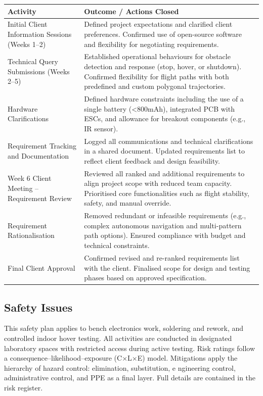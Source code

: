 \begin{tabular}{|p{4cm}|p{10cm}|}
\hline
\rowcolor{gray!15}
\textbf{Activity} & \textbf{Outcome / Actions Closed} \\
\hline
Initial Client Information Sessions (Weeks 1–2) & Defined project expectations and clarified client preferences. Confirmed use of open-source software and flexibility for negotiating requirements. \\ \hline
Technical Query Submissions (Weeks 2–5) & Established operational behaviours for obstacle detection and response (stop, hover, or shutdown). Confirmed flexibility for flight paths with both predefined and custom polygonal trajectories. \\ \hline
Hardware Clarifications & Defined hardware constraints including the use of a single battery (<800mAh), integrated PCB with ESCs, and allowance for breakout components (e.g., IR sensor). \\ \hline
Requirement Tracking and Documentation & Logged all communications and technical clarifications in a shared document. Updated requirements list to reflect client feedback and design feasibility. \\ \hline
Week 6 Client Meeting – Requirement Review & Reviewed all ranked and additional requirements to align project scope with reduced team capacity. Prioritised core functionalities such as flight stability, safety, and manual override. \\ \hline
Requirement Rationalisation & Removed redundant or infeasible requirements (e.g., complex autonomous navigation and multi-pattern path options). Ensured compliance with budget and technical constraints. \\ \hline
Final Client Approval & Confirmed revised and re-ranked requirements list with the client. Finalised scope for design and testing phases based on approved specification. \\ \hline
\end{tabular}

\subsection{Safety Issues}
This safety plan applies to bench electronics work, soldering and rework, and controlled indoor hover testing. All activities are conducted in designated laboratory spaces with restricted access during active testing. Risk ratings follow a consequence–likelihood–exposure (C×L×E) model. Mitigations apply the hierarchy of hazard control: elimination, substitution, e
ngineering control, administrative control, and PPE as a final layer. Full details are contained in the risk register.

